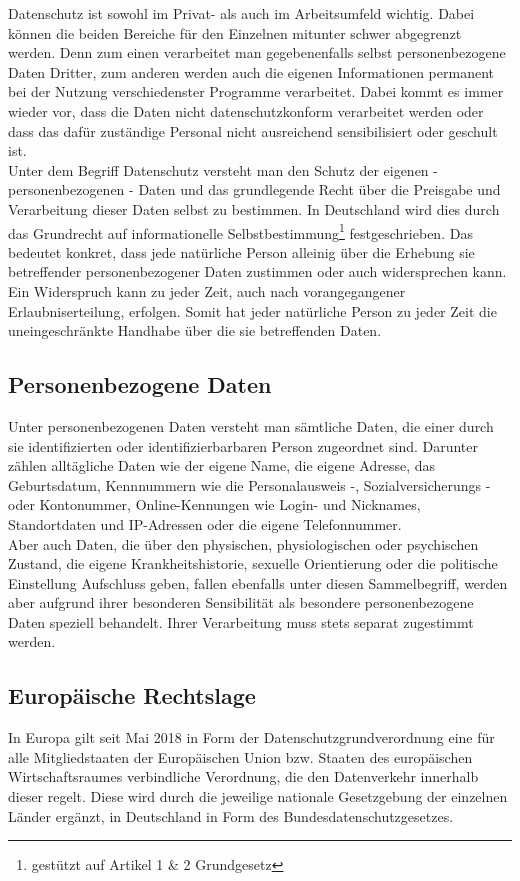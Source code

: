 Datenschutz ist sowohl im Privat- als auch im Arbeitsumfeld wichtig. Dabei können die beiden Bereiche für den Einzelnen mitunter schwer abgegrenzt werden. Denn zum einen verarbeitet man gegebenenfalls selbst personenbezogene Daten Dritter, zum anderen werden auch die eigenen Informationen permanent bei der Nutzung verschiedenster Programme verarbeitet. Dabei kommt es immer wieder vor, dass die Daten nicht datenschutzkonform verarbeitet werden oder dass das dafür zuständige Personal nicht ausreichend sensibilisiert oder geschult ist.\\

Unter dem Begriff Datenschutz versteht man den Schutz der eigenen - personenbezogenen - Daten und das grundlegende Recht über die Preisgabe und Verarbeitung dieser Daten selbst zu bestimmen. In Deutschland wird dies durch das Grundrecht auf informationelle Selbstbestimmung\footnote{gestützt auf Artikel 1 \& 2 Grundgesetz} festgeschrieben. Das bedeutet konkret, dass jede natürliche Person alleinig über die Erhebung sie betreffender personenbezogener Daten zustimmen oder auch widersprechen kann. Ein Widerspruch kann zu jeder Zeit, auch nach vorangegangener Erlaubniserteilung, erfolgen. Somit hat jeder natürliche Person zu jeder Zeit die uneingeschränkte Handhabe über die sie betreffenden Daten.

\subsection{Personenbezogene Daten}
    Unter personenbezogenen Daten versteht man sämtliche Daten, die einer durch sie identifizierten oder identifizierbarbaren Person zugeordnet sind. Darunter zählen alltägliche Daten wie der eigene Name, die eigene Adresse, das Geburtsdatum, Kennnummern wie die Personalausweis -, Sozialversicherungs - oder Kontonummer, Online-Kennungen wie Login- und Nicknames,\\
    Standortdaten und IP-Adressen oder die eigene Telefonnummer.\\
    Aber auch Daten, die über den physischen, physiologischen oder psychischen Zustand, die eigene Krankheitshistorie, sexuelle Orientierung oder die politische Einstellung Aufschluss geben, fallen ebenfalls unter diesen Sammelbegriff, werden aber aufgrund ihrer besonderen Sensibilität als \glqq besondere personenbezogene Daten\grqq{} speziell behandelt. Ihrer Verarbeitung muss stets separat zugestimmt werden.

\subsection{Europäische Rechtslage}
    In Europa gilt seit Mai 2018 in Form der \glqq Datenschutzgrundverordnung\grqq{} eine für alle Mitgliedstaaten der Europäischen Union bzw. Staaten des europäischen Wirtschaftsraumes verbindliche Verordnung, die den Datenverkehr innerhalb dieser regelt. Diese wird durch die jeweilige nationale Gesetzgebung der einzelnen Länder ergänzt, in Deutschland in Form des Bundesdatenschutzgesetzes.


